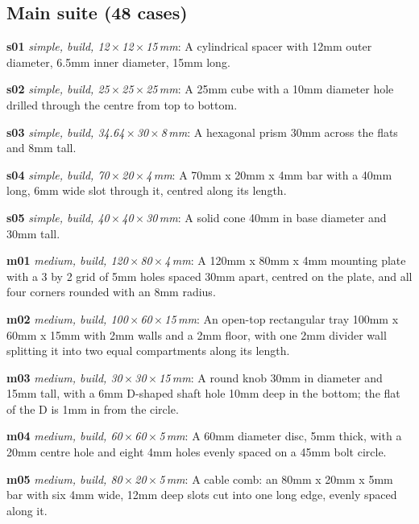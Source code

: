 \subsection*{Main suite (48 cases)}
{\small
\noindent\textbf{s01} \emph{simple, build, 12\,$\times$\,12\,$\times$\,15\,mm}: A cylindrical spacer with 12mm outer diameter, 6.5mm inner diameter, 15mm long.\par
\noindent\textbf{s02} \emph{simple, build, 25\,$\times$\,25\,$\times$\,25\,mm}: A 25mm cube with a 10mm diameter hole drilled through the centre from top to bottom.\par
\noindent\textbf{s03} \emph{simple, build, 34.64\,$\times$\,30\,$\times$\,8\,mm}: A hexagonal prism 30mm across the flats and 8mm tall.\par
\noindent\textbf{s04} \emph{simple, build, 70\,$\times$\,20\,$\times$\,4\,mm}: A 70mm x 20mm x 4mm bar with a 40mm long, 6mm wide slot through it, centred along its length.\par
\noindent\textbf{s05} \emph{simple, build, 40\,$\times$\,40\,$\times$\,30\,mm}: A solid cone 40mm in base diameter and 30mm tall.\par
\noindent\textbf{m01} \emph{medium, build, 120\,$\times$\,80\,$\times$\,4\,mm}: A 120mm x 80mm x 4mm mounting plate with a 3 by 2 grid of 5mm holes spaced 30mm apart, centred on the plate, and all four corners rounded with an 8mm radius.\par
\noindent\textbf{m02} \emph{medium, build, 100\,$\times$\,60\,$\times$\,15\,mm}: An open-top rectangular tray 100mm x 60mm x 15mm with 2mm walls and a 2mm floor, with one 2mm divider wall splitting it into two equal compartments along its length.\par
\noindent\textbf{m03} \emph{medium, build, 30\,$\times$\,30\,$\times$\,15\,mm}: A round knob 30mm in diameter and 15mm tall, with a 6mm D-shaped shaft hole 10mm deep in the bottom; the flat of the D is 1mm in from the circle.\par
\noindent\textbf{m04} \emph{medium, build, 60\,$\times$\,60\,$\times$\,5\,mm}: A 60mm diameter disc, 5mm thick, with a 20mm centre hole and eight 4mm holes evenly spaced on a 45mm bolt circle.\par
\noindent\textbf{m05} \emph{medium, build, 80\,$\times$\,20\,$\times$\,5\,mm}: A cable comb: an 80mm x 20mm x 5mm bar with six 4mm wide, 12mm deep slots cut into one long edge, evenly spaced along it.\par
}

